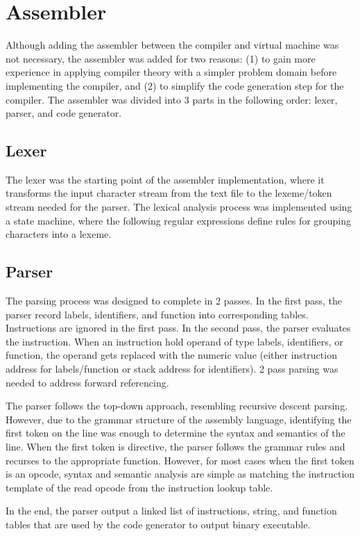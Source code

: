 \documentclass[manuscript,screen,nonacm]{acmart}
\begin{document}
\section{Assembler}
Although adding the assembler between the compiler and virtual machine was not necessary, the assembler was added for two reasons: (1) to gain more experience in applying compiler theory with a simpler problem domain before implementing the compiler, and (2) to simplify the code generation step for the compiler. The assembler was divided into 3 parts in the following order: lexer, parser, and code generator.

\subsection{Lexer}
The lexer was the starting point of the assembler implementation, where it transforms the input character stream from the text file to the lexeme/token stream needed for the parser. The lexical analysis process was implemented using a state machine, where the following regular expressions define rules for grouping characters into a lexeme.

\subsection{Parser}
The parsing process was designed to complete in 2 passes. In the first pass, the parser record labels, identifiers, and function into corresponding tables. Instructions are ignored in the first pass. In the second pass, the parser evaluates the instruction. When an instruction hold operand of type labels, identifiers, or function, the operand gets replaced with the numeric value (either instruction address for labels/function or stack address for identifiers). 2 pass parsing was needed to address forward referencing.

The parser follows the top-down approach, resembling recursive descent parsing. However, due to the grammar structure of the assembly language, identifying the first token on the line was enough to determine the syntax and semantics of the line. When the first token is directive, the parser follows the grammar rules and recurses to the appropriate function. However, for most cases when the first token is an opcode, syntax and semantic analysis are simple as matching the instruction template of the read opcode from the instruction lookup table.

In the end, the parser output a linked list of instructions, string, and function tables that are used by the code generator to output binary executable.
\end{document}
